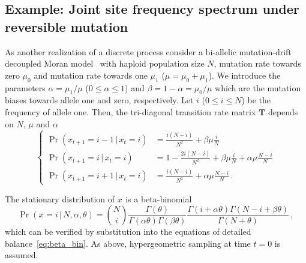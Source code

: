 \documentclass[preprint]{elsarticle}
\newcommand\given{{\,|\,}}
\newcommand\x[1]{\ensuremath{x_{#1}}}
\begin{document}
\subsection{Example: Joint site frequency spectrum under reversible mutation}\label{section:discr_rev_general}
As another realization of a discrete process consider a bi-allelic mutation-drift decoupled Moran model~\citep{Baak08,Ethe09} with haploid population size $N$, mutation rate towards zero $\mu_0$ and mutation rate towards one $\mu_1$ ($\mu=\mu_0+\mu_1$).  We introduce the parameters $\alpha=\mu_1/\mu$ ($0 \leq \alpha \leq 1$) and $\beta=1-\alpha=\mu_0/\mu$ which are the mutation biases towards allele one and zero, respectively.  Let $i$ ($0\leq i\leq N$) be the frequency of allele one. Then, the tri-diagonal transition rate matrix $\mathbf{T}$ depends on $N$, $\mu$ and $\alpha$
\begin{equation}\label{eq:transition_decoupled_Moran}
\begin{cases}
\Pr(\x{t+1}=i-1\given \x{t}=i)&=\frac{i(N-i)}{N^2}+\beta\mu \frac{i}{N}\\
    \Pr(\x{t+1}=i\given \x{t}=i)&=1-\frac{2i(N-i)}{N^2}+\beta\mu \frac{i}{N} + \alpha\mu \frac{N-i}N\\
\Pr(\x{t+1}=i+1\given \x{t}=i)&=\frac{i(N-i)}{N^2}+\alpha\mu \frac{N-i}N\,.
\end{cases}
\end{equation}

The stationary distribution of $\x{}$ is a beta-binomial
\begin{equation}\label{eq:beta_bin}
\Pr(\x{}=i\given N,\alpha,\theta)=\binom{N}{i}
\frac{\Gamma(\theta)}{\Gamma(\alpha\theta)\Gamma(\beta\theta)}
\frac{\Gamma(i+\alpha\theta)\Gamma(N-i+\beta\theta)}{\Gamma(N+\theta)}\,,
\end{equation}
which can be verified by substitution into the equations of detailed balance~\eqref{eq:beta_bin}. As above, hypergeometric sampling at time $t=0$ is assumed.

\end{document}

